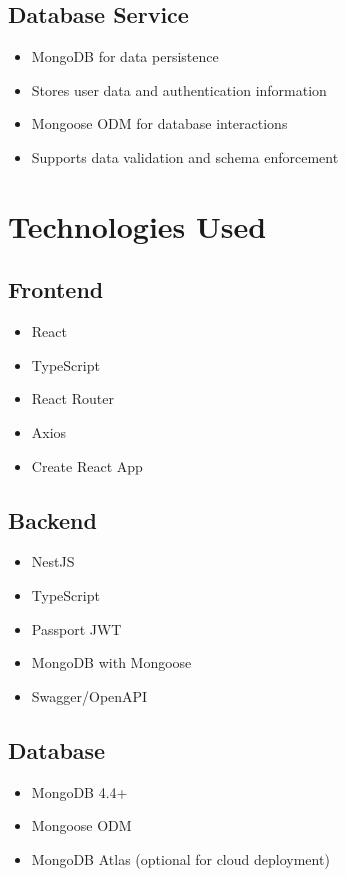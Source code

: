 \documentclass{article}
\begin{document}
\subsection{Database Service}
\begin{itemize}
    \item MongoDB for data persistence
    \item Stores user data and authentication information
    \item Mongoose ODM for database interactions
    \item Supports data validation and schema enforcement
\end{itemize}

\section{Technologies Used}
\subsection{Frontend}
\begin{itemize}
    \item React 
    \item TypeScript
    \item React Router
    \item Axios
    \item Create React App
\end{itemize}

\subsection{Backend}
\begin{itemize}
    \item NestJS
    \item TypeScript
    \item Passport JWT
    \item MongoDB with Mongoose
    \item Swagger/OpenAPI
\end{itemize}

\subsection{Database}
\begin{itemize}
    \item MongoDB 4.4+
    \item Mongoose ODM
    \item MongoDB Atlas (optional for cloud deployment)
\end{itemize}
\end{document}
